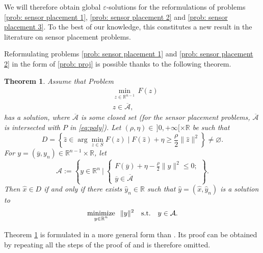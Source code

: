 \documentclass[12pt]{amsart}
\theoremstyle{plain}
\newtheorem{theorem}{Theorem}[section]
\theoremstyle{definition}
\newcommand{\minimize}[2]{\ensuremath{\underset
		{\substack{{#1}}}%
		{\text{\rm minimize}}\;\;#2 }}
\begin{document}
We will therefore obtain global $\varepsilon$-solutions for the reformulations of problems \eqref{prob: sensor placement 1}, \eqref{prob: sensor placement 2} and \eqref{prob: sensor placement 3}. To the best of our knowledge, this constitutes a new result in the literature on sensor placement problems.

Reformulating problems \eqref{prob: sensor placement 1} and \eqref{prob: sensor placement 2} in the form of \eqref{prob: proj} is possible thanks to the following theorem.

\begin{theorem}\cite[Theorem 1]{bednarczuk2026outer}
\label{th: minnoncon}
Assume that Problem
\begin{equation}
\label{prob: proj_pre}
\begin{split}
&\operatorname{min}_{z\in \mathbb{R}^{n-1}}\, F(z)\\
&z\in \overline{\mathcal{A}},
\end{split}
\end{equation}
has a solution, where $\overline{\mathcal{A}}$ is some closed set (for the sensor placement problems, $\overline{\mathcal{A}}$ is intersected with $P$ in \eqref{eq:poly}). Let $(\rho,\eta)\in\, ]0,+\infty[ \times \mathbb{R}$ be such that
\begin{equation}
\label{set: D}
D = \left\{\widehat{z}\in \arg\min_{z\in S}F(z) \mid F(\widehat{z}) + \eta \ge \frac{\rho}{2}\|\widehat{z}\|^2\right\}\neq\varnothing.
\end{equation}
For $y = (\overline{y}, y_{n}) \in \mathbb{R}^{n-1}\times \mathbb{R}$, let
\begin{equation}
\label{eq: new constr form}
\mathcal{A}:=
\left\{y\in \mathbb{R}^n \ |\ \begin{cases}
F(\overline{y}) + \eta - \frac{\rho}{2}\|y\|^2\le 0; \\
\overline{y}\in \overline{\mathcal{A}}
\end{cases}\right\}.
\end{equation}
Then $\widehat{x} \in D$ if and only if there exists $\widehat{y}_{n}\in \mathbb{R}$ such that $\widehat{y} = (\widehat{x}, \widehat{y}_{n})$ is a solution to
\begin{equation}
\label{problem2}
\minimize{y\in\mathbb{R}^{n}}\,\|y\|^2\quad \text{s.t.}\quad y\in \mathcal{A}.
\end{equation}
\end{theorem}

Theorem \ref{th: minnoncon} is formulated in a more general form than \cite[Theorem 1]{bednarczuk2026outer}. Its proof can be obtained by repeating all the steps of the proof of \cite[Theorem 1]{bednarczuk2026outer} and is therefore omitted.
\end{document}

